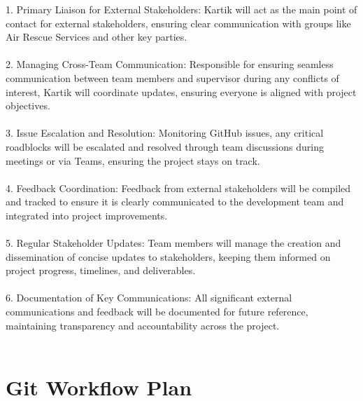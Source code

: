 \documentclass{article}
\begin{document}
1.	Primary Liaison for External Stakeholders: Kartik will act as the main point of contact for external stakeholders, ensuring clear communication with groups like Air Rescue Services and other key parties. \\
\\

2.	Managing Cross-Team Communication: Responsible for ensuring seamless communication between team members and supervisor during any conflicts of interest, Kartik will coordinate updates, ensuring everyone is aligned with project objectives. \\
\\

3.	Issue Escalation and Resolution: Monitoring GitHub issues, any critical roadblocks will be escalated and resolved through team discussions during meetings or via Teams, ensuring the project stays on track.\\
\\

4.	Feedback Coordination: Feedback from external stakeholders will be compiled and tracked to ensure it is clearly communicated to the development team and integrated into project improvements.\\
\\

5.	Regular Stakeholder Updates: Team members will manage the creation and dissemination of concise updates to stakeholders, keeping them informed on project progress, timelines, and deliverables. \\
\\

6.	Documentation of Key Communications: All significant external communications and feedback will be documented for future reference, maintaining transparency and accountability across the project.\\
\\


\section*{Git Workflow Plan}
\end{document}
